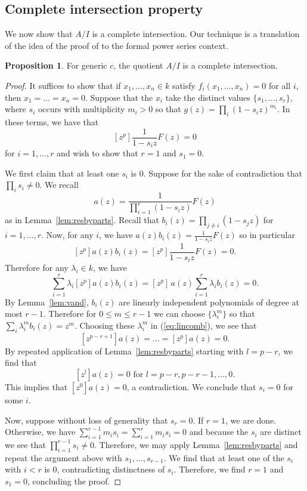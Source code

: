 \documentclass{amsart}
\numberwithin{equation}{section}
\theoremstyle{definition}
\newtheorem{proposition}[theorem]{Proposition}
\begin{document}
\subsection{Complete intersection property}

We now show that $A/I$ is a complete intersection.  Our technique is a translation of the idea of the proof of \cite[Theorem 3.2]{CE} to the formal power series context.

\begin{proposition}\label{prop:ci}
For generic $c$, the quotient $A/I$ is a complete intersection. 
\end{proposition}
\begin{proof}
It suffices to show that if $x_1,\dots,x_{n} \in k$ satisfy $f_i(x_1,\dots,x_{n})=0$ for all $i$, then $x_1=\dots=x_{n}=0$.  Suppose that the $x_i$ take the distinct values $\{s_1,\dots,s_{r}\}$, where $s_i$ occurs with multiplicity $m_i>0$ so that $g(z)=\prod_i (1-s_iz)^{m_i}$.  In these terms, we have that 
\[
[z^p]\frac{1}{1-s_iz}F(z)= 0
\]
for $i = 1, \ldots, r $ and wish to show that $r=1$ and $s_1=0$. 

We first claim that at least one $s_i$ is $0$. Suppose for the sake of contradiction that $\prod_i s_i \ne 0$.  We recall
\[
a(z)=\frac{1}{\prod_{i=1}^{r}(1-s_iz)}F(z)
\]
as in Lemma~\ref{lem:resbyparts}.  Recall that $b_i(z)=\prod_{j \ne i} (1-s_jz)$ for $i=1,\dots,r$.   Now, for any $i$, we have $a(z)b_i(z)=\frac{1}{1-s_iz}F(z)$ so in particular 
\[
[z^p]a(z)b_i(z)=[z^p]\frac{1}{1-s_iz}F(z)=0.
\]
Therefore for any $\lambda_i \in k$, we have
\begin{equation}\label{eq:lincomb}
\sum_{i=1}^{r} \lambda_i[z^p]a(z)b_i(z)=[z^p] \,a(z)\sum_{i=1}^{r}\lambda_ib_i(z)=0.
\end{equation}
By Lemma~\ref{lem:vand}, $b_i(z)$ are linearly independent polynomials of degree at most $r-1$. Therefore for $0 \le m \le r-1$ we can choose $\{\lambda_i^m\}$ so that $\sum_i\lambda_i^mb_i(z)=z^m$. Choosing these $\lambda_i^m$ in (\ref{eq:lincomb}), we see that
\[
[z^{p-r+1}]a(z)=\dots=[z^p]a(z)=0.
\]
By repeated application of Lemma~\ref{lem:resbyparts} starting with $l=p-r$, we find that 
\[
[z^l]a(z)=0 \text{ for $l=p-r,p-r-1,\dots,0$}.
\]
This implies that $[z^0]a(z)=0$, a contradiction. We conclude that $s_i=0$ for some $i$.

Now, suppose without loss of generality that $s_{r}=0$. If $r = 1$, we are done.  Otherwise, we have $\sum_{i=1}^{r-1} m_is_i = \sum_{i=1}^{r} m_is_i = 0$ and because the $s_i$ are distinct we see that $\prod_{i=1}^{r-1} s_i \ne 0$.  Therefore, we may apply Lemma~\ref{lem:resbyparts} and repeat the argument above with $s_1, \ldots, s_{r - 1}$.  We find that at least one of the $s_i$ with $i < r$ is $0$, contradicting distinctness of $s_i$. Therefore, we find $r=1$ and $s_1=0$, concluding the proof.
\end{proof}
\end{document}
